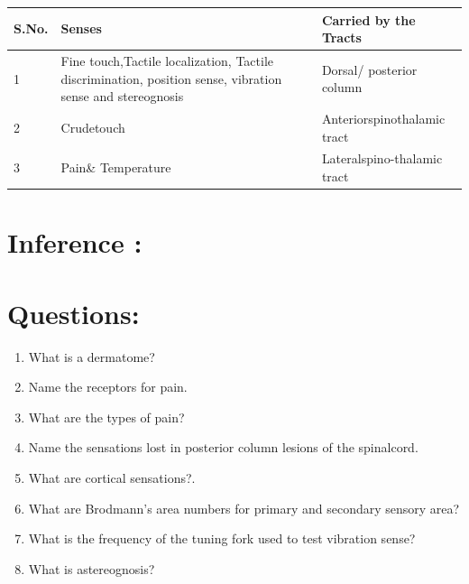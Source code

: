 \documentclass[a4paper,12pt]{book}
\begin{document}
	\begin{table}[H]
\centering
		\begin{tabular}{|p{1in}|p{1.75in}|p{1.75in}|}
\hline
S.No. & \textbf{Senses}                                                                                       & \textbf{Carried by the Tracts}  \\
\hline
1     & Fine touch,Tactile localization, Tactile discrimination, position sense, vibration sense and stereognosis & Dorsal/ posterior column       \\
\hline
2     & Crudetouch                                                                                            & Anteriorspinothalamic tract    \\
\hline
3     & Pain\& Temperature                                                                                    & Lateralspino-thalamic tract    \\
\hline
\end{tabular}
\end{table}

\section*{Inference :}
\vspace{2in}



\section*{Questions:}
\begin{enumerate}
\item{What is a dermatome?}
\item{Name the receptors for pain.}
\item{What are the types of pain?}
\item{Name the sensations lost in posterior column lesions of the spinalcord.}
\item{What are cortical sensations?.}
\item{What are Brodmann’s area numbers for primary and secondary sensory area?}
\item{What is the frequency of the tuning fork used to test vibration sense?}
\item{What is astereognosis?}
\end{enumerate}
\end{document}
